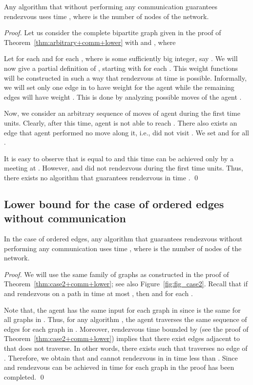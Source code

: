 \documentclass{llncs}
\begin{document}
\begin{theorem} \label{thm:case1+no-comm}
Any  algorithm that without performing any communication guarantees rendezvous uses time , where  is the number of nodes of the network.
\end{theorem}

\begin{proof}
Let us consider the complete bipartite graph  given in the proof of Theorem~\ref{thm:arbitrary+comm+lower}
with 
and , where


Let  for each  and  for each , where  is some sufficiently big integer, say .
We will now give a partial definition of , starting with  for each .
This weight functions will be constructed in such a way that rendezvous at time  is possible.
Informally, we will set only one edge in  to have weight  for the agent  while the remaining edges will have weight .
This is done by analyzing possible moves of the agent .

Now, we consider an arbitrary sequence of moves of agent  during the first  time units.
Clearly, after this time, agent  is not able to reach .
There also exists an edge  that agent  performed no move along it, i.e.,  did not visit .
We set  and  for all .

It is easy to observe that  is equal to  and this time can be achieved only by a meeting at .
However,  and  did not rendezvous during the first  time units.
Thus, there exists no algorithm that guarantees rendezvous in time .
\qed\end{proof}



\subsection{Lower bound for the case of ordered edges without communication}


\begin{theorem} \label{thm:case2+no-comm}
In the case of ordered edges, any algorithm that guarantees rendezvous without performing any communication uses time , where  is the number of nodes of the network.
\end{theorem}
\begin{proof}
We will use the same family of graphs  as constructed in the proof of Theorem~\ref{thm:case2+comm+lower}; see also Figure~\ref{fig:fig_case2}.
Recall that if  and  rendezvous on a path  in time at most , then  and
 for each .

\smallskip
Note that, the agent  has the same input for each graph in  since  is the same for all graphs in .
Thus, for any algorithm , the agent  traverses the same sequence of edges for each graph in .
Moreover, rendezvous time bounded by  (see the proof of Theorem~\ref{thm:case2+comm+lower}) implies that there exist edges adjacent to  that  does not traverse.
In other words, there exists  such that  traverses no edge of .
Therefore, we obtain that  and  cannot rendezvous in  in time less than .
Since  and rendezvous can be achieved in time  for each graph in  the proof has been completed.
\qed\end{proof}
\end{document}
